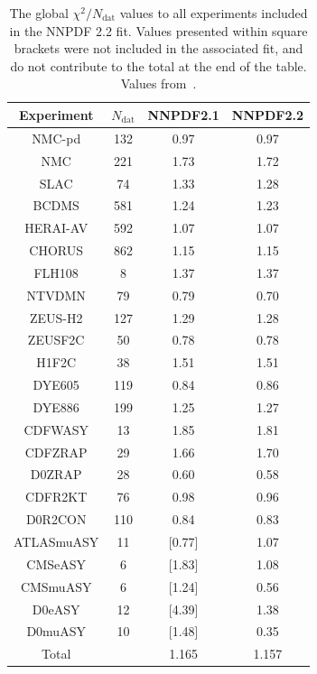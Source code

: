 \begin{table}[hp!]
  \begin{center}
    \begin{tabular}{|c|c|c|c|}
      \hline 
      Experiment & $N_{\mathrm{dat}} $ & NNPDF2.1 & NNPDF2.2 \\
      \hline
      \hline
      NMC-pd     &  132 &  0.97 &   0.97 \\
      \hline
      NMC        &  221 &  1.73 &    1.72 \\
      \hline
      SLAC       &   74 &  1.33 &    1.28 \\
      \hline
      BCDMS      &  581 &  1.24 &   1.23 \\
      \hline
      HERAI-AV   &  592 &  1.07 &   1.07 \\
      \hline
      CHORUS     &  862 &  1.15 &    1.15 \\
      \hline
      FLH108     &    8 &  1.37 &    1.37 \\
      \hline
      NTVDMN     &   79 &  0.79 &    0.70 \\
      \hline
      ZEUS-H2    &  127 &  1.29 &    1.28 \\
      \hline
      ZEUSF2C    &   50 &  0.78 &   0.78 \\
      \hline
      H1F2C      &   38 &  1.51 &    1.51 \\
      \hline
      DYE605     &  119 &  0.84 &    0.86 \\
      \hline
      DYE886     &  199 &  1.25 &    1.27 \\
      \hline
      CDFWASY    &   13 &  1.85 &    1.81 \\
      \hline
      CDFZRAP    &   29 &  1.66 &    1.70 \\
      \hline
      D0ZRAP     &   28 &  0.60 &    0.58 \\
      \hline
      CDFR2KT    &   76 &  0.98 &    0.96 \\
      \hline
      D0R2CON    &  110 &  0.84 &   0.83 \\
      \hline
      \hline
      ATLASmuASY &   11 & [0.77]  &   1.07  \\
      \hline
      CMSeASY    &   6 &  [1.83]  &    1.08  \\
      \hline
      CMSmuASY   &   6 &  [1.24]  &    0.56  \\
      \hline
      D0eASY     &   12 & [4.39]  &    1.38  \\
      \hline
      D0muASY    &   10 & [1.48]  &    0.35  \\
      \hline
      \hline
      Total      &      &  1.165 &    1.157 \\
      \hline
    \end{tabular}
  \end{center}
  \caption[The global fit quality to all experiments included in the NNPDF 2.2 fit]{The global $\chi^2/N_{\text{dat}}$ values to all experiments included in the NNPDF 2.2 fit. Values presented within square brackets were not included in the associated fit, and do not contribute to the total at the end of the table. Values from~\cite{Ball:2011gg}.}
  \label{tab:chisq22}
\end{table}


